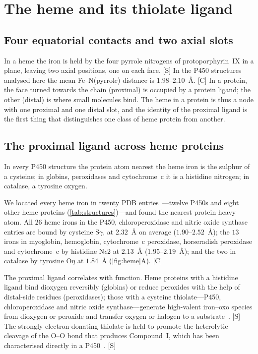 \documentclass[10pt,twocolumn,a4paper]{article}
\newcommand{\Sup}{\textsf{[S]}}
\newcommand{\C}{\textsf{[C]}}
\begin{document}
\section{The heme and its thiolate ligand}
\label{sec:heme}

\subsection{Four equatorial contacts and two axial slots}

In a heme the iron is held by the four pyrrole nitrogens of protoporphyrin~IX
in a plane, leaving two axial positions, one on each face. \Sup{} In the
P450 structures analysed here the mean Fe--N(pyrrole) distance is
$1.98$--$2.10$~\AA. \C{} In a protein, the face turned towards the chain
(proximal) is occupied by a protein ligand; the other (distal) is where
small molecules bind. The heme in a protein is thus a node with one proximal
and one distal slot, and the identity of the proximal ligand is the first
thing that distinguishes one class of heme protein from another.

\subsection{The proximal ligand across heme proteins}

\begin{prediction}
\label{pred:proximal}
In every P450 structure the protein atom nearest the heme iron is the
sulphur of a cysteine; in globins, peroxidases and cytochrome~c it is a
histidine nitrogen; in catalase, a tyrosine oxygen.
\end{prediction}

We located every heme iron in twenty PDB entries~\citep{berman2000}---twelve
P450s and eight other heme proteins (\cref{tab:structures})---and found the
nearest protein heavy atom. All $26$ heme irons in the P450,
chloroperoxidase and nitric oxide synthase entries are bound by cysteine
S$\gamma$, at $2.32$~\AA{} on average ($1.90$--$2.52$~\AA); the $13$ irons in
myoglobin, hemoglobin, cytochrome~c peroxidase, horseradish peroxidase and
cytochrome~c by histidine N$\epsilon2$ at $2.13$~\AA{} ($1.95$--$2.19$~\AA);
and the two in catalase by tyrosine O$\eta$ at $1.84$~\AA{}
(\cref{fig:heme}A). \C

The proximal ligand correlates with function. Heme proteins with a histidine
ligand bind dioxygen reversibly (globins) or reduce peroxides with the help of
distal-side residues (peroxidases); those with a cysteine thiolate---P450,
chloroperoxidase and nitric oxide synthase---generate high-valent iron--oxo
species from dioxygen or peroxide and transfer oxygen or halogen to a
substrate~\citep{dawson1988,poulos2014}. \Sup{} The strongly electron-donating
thiolate is held to promote the heterolytic cleavage of the O--O bond that
produces Compound~I, which has been characterised directly in a
P450~\citep{rittle2010}. \Sup
\end{document}
